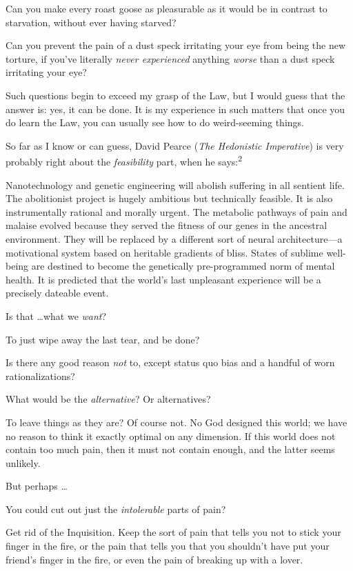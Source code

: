 {
 Can you make every roast goose as pleasurable as it would be in
contrast to starvation, without ever having starved?}

{
 Can you prevent the pain of a dust speck irritating your eye from
being the new torture, if you've literally
\textit{never experienced} anything \textit{worse} than a dust speck
irritating your eye?}

{
 Such questions begin to exceed my grasp of the Law, but I would
guess that the answer is: yes, it can be done. It is my experience in
such matters that once you do learn the Law, you can usually see how to
do weird-seeming things.}

{
 So far as I know or can guess, David Pearce (\textit{The
Hedonistic Imperative}) is very probably right about the
\textit{feasibility} part, when he says:\textsuperscript{2}}

{
 Nanotechnology and genetic engineering will abolish suffering in
all sentient life. The abolitionist project is hugely ambitious but
technically feasible. It is also instrumentally rational and morally
urgent. The metabolic pathways of pain and malaise evolved because they
served the fitness of our genes in the ancestral environment. They will
be replaced by a different sort of neural architecture---a motivational
system based on heritable gradients of bliss. States of sublime
well-being are destined to become the genetically pre-programmed norm
of mental health. It is predicted that the world's last
unpleasant experience will be a precisely dateable event.}

{
 Is that \ldots what we \textit{want}?}

{
 To just wipe away the last tear, and be done?}

{
 Is there any good reason \textit{not} to, except status quo bias
and a handful of worn rationalizations?}

{
 What would be the \textit{alternative}? Or alternatives?}

{
 To leave things as they are? Of course not. No God designed this
world; we have no reason to think it exactly optimal on any dimension.
If this world does not contain too much pain, then it must not contain
enough, and the latter seems unlikely.}

{
 But perhaps \ldots}

{
 You could cut out just the \textit{intolerable} parts of pain?}

{
 Get rid of the Inquisition. Keep the sort of pain that tells you
not to stick your finger in the fire, or the pain that tells you that
you shouldn't have put your friend's
finger in the fire, or even the pain of breaking up with a lover.}

